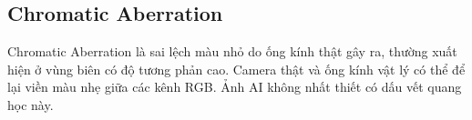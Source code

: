 \subsection{Chromatic Aberration}
Chromatic Aberration là sai lệch màu nhỏ do ống kính thật gây ra, thường xuất hiện ở vùng biên có độ tương phản cao. Camera thật và ống kính vật lý có thể để lại viền màu nhẹ giữa các kênh RGB. Ảnh AI không nhất thiết có dấu vết quang học này.
